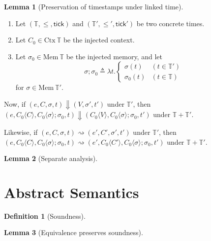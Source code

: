 \documentclass{article}
\theoremstyle{definition}
\newtheorem{definition}{Definition}[section]
\newtheorem{lem}{Lemma}[section]
\newcommand*{\Time}{\mathbb{T}}
\newcommand*{\Ctx}[1]{\text{Ctx}\:{#1}}
\newcommand*{\Mem}[1]{\text{Mem}\:{#1}}
\newcommand*{\tick}{\mathsf{tick}}
\newcommand*{\inject}[2]{{#1}\langle{#2}\rangle}
\begin{document}
\begin{lem}[Preservation of timestamps under linked time]
  $\:$

  \begin{enumerate}
    \item Let $(\Time,\le,\tick)$ and $(\Time',\le',\tick')$ be two concrete times.
    \item Let $C_{0}\in\Ctx{\Time}$ be the injected context.
    \item Let $\sigma_{0}\in\Mem{\Time}$ be the injected memory, and let
          \[
            \sigma;\sigma_{0}\triangleq\lambda t.
            \begin{cases}
              \sigma(t)     & (t\in\Time') \\
              \sigma_{0}(t) & (t\in\Time)
            \end{cases}
          \]
          for $\sigma\in\Mem{\Time'}$.
  \end{enumerate}

  Now, if $(e,C,\sigma,t)\Downarrow(V,\sigma',t')$ under $\Time'$, then
  $(e,\inject{C_0}{C},\inject{C_0}{\sigma};\sigma_{0},t)\Downarrow(\inject{C_0}{V},\inject{C_0}{\sigma};\sigma_0,t')$ under $\Time+\Time'$.

  Likewise, if $(e,C,\sigma,t)\rightsquigarrow(e',C',\sigma',t')$ under $\Time'$, then
  $(e,\inject{C_0}{C},\inject{C_0}{\sigma};\sigma_{0},t)\rightsquigarrow(e',\inject{C_0}{C'},\inject{C_0}{\sigma};\sigma_0,t')$ under $\Time+\Time'$.
\end{lem}

\begin{lem}[Separate analysis]

\end{lem}

\section{Abstract Semantics}
\begin{definition}[Soundness]
\end{definition}

\begin{lem}[Equivalence preserves soundness]
\end{lem}

\printbibliography
\end{document}
